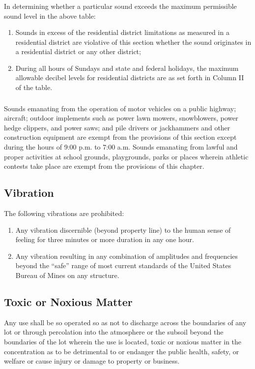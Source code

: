 \subsubsection{}
In determining whether a particular sound exceeds the maximum permissible sound level in the above table: 
\begin{enumerate}[{\indent}a)]
    \item Sounds in excess of the residential district limitations as measured in a residential district are violative of this section whether the sound originates in a residential district or any other district; 
    \item During all hours of Sundays and state and federal holidays, the maximum allowable decibel levels for residential districts are as set forth in Column II of the table.
\end{enumerate}
\subsubsection{}
Sounds emanating from the operation of motor vehicles on a public highway; aircraft; outdoor implements such as power lawn mowers, snowblowers, power hedge clippers, and power saws; and pile drivers or jackhammers and other construction equipment are exempt from the provisions of this section except during the hours of 9:00 p.m. to 7:00 a.m. Sounds emanating from lawful and proper activities at school grounds, playgrounds, parks or places wherein athletic contests take place are exempt from the provisions of this chapter.
\subsection{Vibration}
The following vibrations are prohibited:
\begin{enumerate}[{\indent}1)]
    \item Any vibration discernible (beyond property line) to the human sense of feeling for three minutes or more duration in any one hour.
    \item Any vibration resulting in any combination of amplitudes and frequencies beyond the “safe” range of most current standards of the United States Bureau of Mines on any structure.
\end{enumerate}
\subsection{Toxic or Noxious Matter}
Any use shall be so operated so as not to discharge across the boundaries of any lot or through percolation into the atmosphere or the subsoil beyond the boundaries of the lot wherein the use is located, toxic or noxious matter in the concentration as to be detrimental to or endanger the public health, safety, or welfare or cause injury or damage to property or business.
